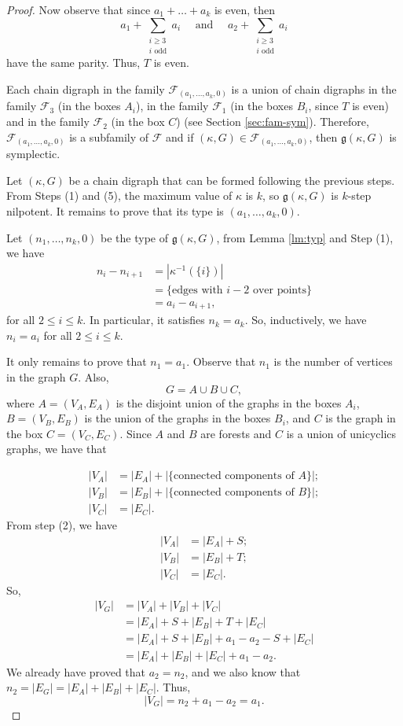 \documentclass[a4paper,11pt]{amsart}
\theoremstyle{definition}
\theoremstyle{remark}
\numberwithin{equation}{section}
\newcommand{\g}{\mathfrak{g}}
\begin{document}
\begin{proof}
Now observe that since \(a_1+\dots+a_k\) is even, then 
\[
a_1+\sum_{\substack{i\ge 3 \\ i \text{ odd}}} a_{i} \quad \text{ and } \quad a_2+\sum_{\substack{i\ge 3 \\ i \text{ odd}}} a_{i}
\] 
have the same parity. Thus, $T$ is even.

Each chain digraph in the family \(\mathcal{F}_{(a_1,\dots,a_k,0)}\) is a union of chain digraphs in the family \(\mathcal{F}_3\) (in the boxes \(A_i\)), in the family \(\mathcal{F}_1\) (in the boxes \(B_i\), since \(T\) is even) and in the family \(\mathcal{F}_2\) (in the box \(C\)) (see Section \ref{sec:fam-sym}). Therefore, \(\mathcal{F}_{(a_1,\dots,a_k,0)}\) is a subfamily of  \(\mathcal{F}\) and if \((\kappa,G)\in  \mathcal{F}_{(a_1,\dots,a_k,0)}\), then \(\g(\kappa,G)\) is symplectic.



Let \((\kappa,G)\) be a chain digraph that can be formed following the previous steps. From Steps (1) and (5), the maximum value of \(\kappa\) is \(k\), so \(\g(\kappa,G)\) is \(k\)-step nilpotent. It remains to prove that its type is \((a_1,\dots,a_k,0)\). 

Let \((n_1,\dots,n_k,0)\) be the type of \(\g(\kappa,G)\), from Lemma \ref{lm:typ} and Step (1), we have 
\begin{align*}
n_i-n_{i+1}&=|\kappa^{-1}(\{i\})|\\
&=\{\text{edges with \(i-2\) over points}\}\\
&=a_i-a_{i+1},
\end{align*}
for all \(2\leq i\leq k\). 
In particular, it satisfies \(n_k=a_k\). So, inductively, we have \(n_i=a_i\) for all \(2\leq i\leq k\).

It only remains to prove that \(n_1=a_1\). Observe that \(n_1\) is the number of vertices in the graph \(G\). Also, 
\[G=A\cup B\cup C,\]
where \(A=(V_A,E_A)\) is the disjoint union of the graphs in the boxes \(A_i\), \(B=(V_B,E_B)\) is the union of the graphs in the boxes \(B_i\), and \(C\) is the graph in the box \(C=(V_C,E_C)\).  
Since \(A\) and \(B\) are forests and \(C\) is a union of unicyclics graphs, we have that

\begin{align*}
|V_A|&=|E_A|+|\{\text{connected components of } A\}|;\\
|V_B|&=|E_B|+|\{\text{connected components of } B\}|;\\
|V_C|&=|E_C|.
\end{align*}
From step (2), we have
\begin{align*}
|V_A|&=|E_A|+S;\\
|V_B|&=|E_B|+T;\\
|V_C|&=|E_C|.
\end{align*}
So, 
\begin{align*}
|V_G|&=|V_A|+|V_B|+|V_C|\\
&=|E_A|+S + |E_B|+ T +|E_C|\\
&=|E_A|+S+|E_B|+a_1-a_2-S+|E_C|\\
&=|E_A|+|E_B|+|E_C|+a_1-a_2.
\end{align*}
We already have proved that \(a_2=n_2\), and we also know that \(n_2=|E_G|=|E_A|+|E_B|+|E_C|\). Thus, 
\[|V_G|=n_2+a_1-a_2=a_1.\]



\end{proof}
\end{document}
